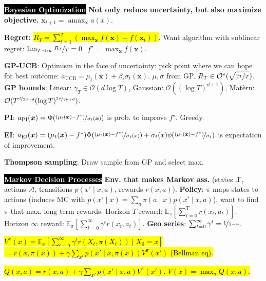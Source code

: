 \documentclass{article}
\DeclareMathOperator*{\argmax}{amax}
\newcommand{\E}{\mathbb{E}}
\newenvironment{topic}[1]
{\textbf{\sffamily  \colorbox{black}{\textcolor{white}{#1}}}}
{}
\begin{document}
\begin{multicols*}{3}
  \begin{topic}{Bayesian Optimization}
    \textbf{Not only reduce uncertainty, but also maximize objective.}
    $\bm{x}_{t+1} = \argmax_{\bm{x}} a(x)$.

    \textbf{Regret:} \hl{$R_T = \sum_{t=1}^T (\max_{\bm{x}} f(\bm{x}) -
    f(\bm{x}_t))$}. Want algorithm with sublinear regret: $\lim_{T\to\infty}
    \nicefrac{R_T}{T} = 0$. $f^\star = \max_{\bm{x}} f(\bm{x})$.

    \textbf{GP-UCB}: Optimism in the face of uncertainty: pick point where we
    can hope for best outcome: $a_{\text{UCB}} = \mu_t(\bm{x}) + \beta_t
    \sigma_t(\bm{x})$. $\mu, \sigma$ from GP. $R_T \in
    \mathcal{O}^\star(\sqrt{\nicefrac{\gamma_T}{T}})$. \textbf{GP bounds}:
    Linear: $\gamma_T \in \mathcal{O}(d\log T)$, Gaussian: $\mathcal{O}((\log
    T)^{d+1})$, Mat\`ern: $\mathcal{O}(T^{\nicefrac{d}{2\nu+d}}(\log
    T)^{\nicefrac{2\nu}{2\nu+d}})$.

    \textbf{PI}: $a_{\text{PI}}(\bm{x}) = \Phi(\nicefrac{(\mu_t(\bm{x}) -
    f^\star)}{\sigma_t(\bm{x})})$ is prob. to improve $f^\star$. Greedy.

    \textbf{EI}: $a_{\text{EI}}(\bm{x}) = (\mu_t(\bm{x}) - f^*)
    \Phi(\nicefrac{(\mu_t(\bm{x}) - f^\star)}{\sigma_t(x)}) + \sigma_t(x)
    \phi(\nicefrac{(\mu_t(\bm{x})-f^\star)}{\sigma_t})$ is expectation of
    improvement.

    \textbf{Thompson sampling}: Draw sample from GP and select max.
  \end{topic}

  \begin{topic}{Markov Decision Processes}
    \textbf{Env. that makes Markov ass.} (states $\mathcal{X}$, actions
    $\mathcal{A}$, transitions $p(x'\mid x,a)$, rewards $r(x,a)$).
    \textbf{Policy}: $\pi$ maps states to actions (induces MC with $p(x'\mid x)
    = \sum_a \pi(a\mid x) p(x'\mid x,a)$), want to find $\pi$ that max.
    long-term rewards. Horizon $T$ reward: $\E_\pi[\sum_{t=0}^T r(x_t,a_t)]$.
    Horizon $\infty$ reward: $\E_\pi[\sum_{t=0}^\infty \gamma^t r(x_t,a_t)]$.
    \textbf{Geo series}: $\sum_{t=0}^\infty \gamma^t = \nicefrac{1}{1-\gamma}$.

    \hl{$V^\pi(x) = \E_x [\sum_{t=0}^\infty \gamma^t r(X_t,\pi(X_t)) \mid
    X_0=x]$ $= r(x,\pi(x)) + \gamma \sum_{x'} p(x'\mid x,\pi(x)) V^\pi(x')$
    (Bellman eq).}

    \hl{$Q(x,a) = r(x,a) + \gamma \sum_{x'} p(x'\mid x,a)V^\pi(x')$. $V(x) = \max_a
    Q(x,a)$.}


\end{topic}
\end{multicols*}
\end{document}
